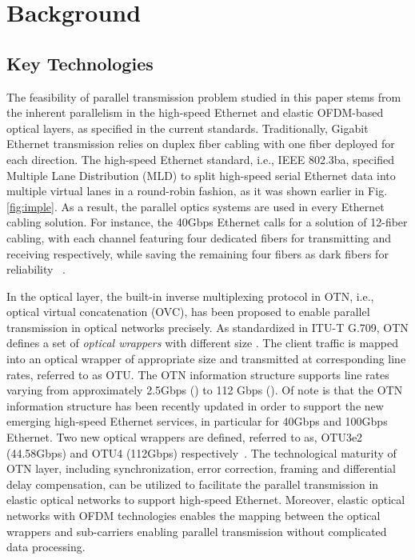 \documentclass[conference]{IEEEtran}
\begin{document}
 
\section{Background}\label{implementation}
\subsection{Key Technologies} 
\par The feasibility of parallel transmission problem studied in this paper stems from the inherent  parallelism in the high-speed Ethernet and elastic OFDM-based optical layers, as specified in the current standards.  Traditionally,  Gigabit Ethernet transmission relies on duplex fiber cabling with one fiber deployed for each direction. The high-speed Ethernet standard, i.e., IEEE 802.3ba, specified Multiple Lane Distribution (MLD) to  split   high-speed serial Ethernet data  into multiple virtual lanes in a round-robin fashion, as it was shown earlier in  Fig.\ref{fig:imple}. As a result, the parallel optics systems are used in every Ethernet cabling solution. For instance, the 40Gbps  Ethernet calls for a solution of  12-fiber cabling, with  each channel featuring four dedicated fibers for transmitting and receiving respectively, while saving  the remaining  four fibers as dark fibers for reliability~\cite{802.3ba} .   
  
\par In the optical layer, the built-in inverse multiplexing protocol in OTN, i.e.,  optical virtual concatenation (OVC), has been proposed to enable parallel transmission in optical networks precisely.  As standardized in ITU-T G.709, OTN defines a set of \emph{optical wrappers} with different size  \cite{Gumaste:Comag:2010}. The client traffic is  mapped  into an optical wrapper of appropriate size and transmitted at corresponding line rates, referred to as OTU. The OTN information structure supports  line rates varying from approximately 2.5Gbps () to 112 Gbps ().  Of note is that the OTN information structure  has been recently updated in order to support the new emerging high-speed Ethernet services, in particular for 40Gbps and 100Gbps Ethernet. Two new optical wrappers are defined, referred to as, OTU3e2 (44.58Gbps) and OTU4 (112Gbps) respectively~\cite{ITU-T:G.709}.   The technological maturity of OTN layer, including synchronization, error correction, framing  and differential delay compensation, can be utilized to facilitate the parallel transmission in elastic optical networks to support high-speed Ethernet.  Moreover, elastic optical networks with OFDM technologies enables the mapping between the optical wrappers and sub-carriers enabling parallel transmission without complicated data processing.     
  
\end{document}
